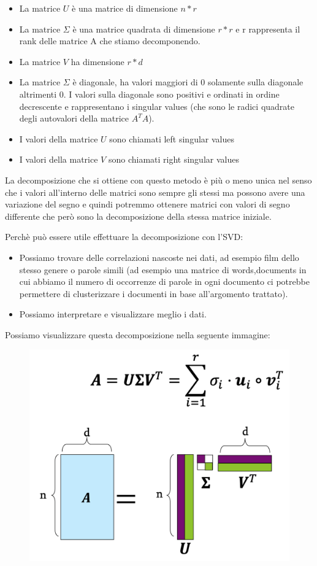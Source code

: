 \documentclass[14pt]{extreport}
\begin{document}
\begin{itemize}
	\item La matrice $U$ è una matrice di dimensione $n*r$
	\item La matrice $\Sigma$ è una matrice quadrata di dimensione $r*r$ e r rappresenta il rank delle matrice A che stiamo decomponendo.
	\item La matrice $V$ ha dimensione $r*d$
	\item La matrice $\Sigma$ è diagonale, ha valori maggiori di 0 solamente sulla diagonale altrimenti 0. I valori sulla diagonale sono positivi e
	      ordinati in ordine decrescente e rappresentano i singular values (che sono le radici quadrate degli autovalori della matrice $A^TA$).
	\item I valori della matrice $U$ sono chiamati left singular values
	\item I valori della matrice $V$ sono chiamati right singular values
\end{itemize}

La decomposizione che si ottiene con questo metodo è più o meno unica nel senso che i valori all'interno delle matrici sono sempre gli stessi ma
possono avere una variazione del segno e quindi potremmo ottenere matrici con valori di segno differente che però sono la decomposizione della stessa
matrice iniziale.

Perchè può essere utile effettuare la decomposizione con l'SVD:
\begin{itemize}
	\item Possiamo trovare delle correlazioni nascoste nei dati, ad esempio film dello stesso genere o parole simili (ad esempio una matrice di
	      words,documents in cui abbiamo il numero di occorrenze di parole in ogni documento ci potrebbe permettere di clusterizzare i documenti in
	      base all'argomento trattato).
	\item Possiamo interpretare e visualizzare meglio i dati.
\end{itemize}

Possiamo visualizzare questa decomposizione nella seguente immagine:


\begin{figure}[H]
	\centering
	\includegraphics[width=0.7\linewidth]{496.jpeg}
\end{figure}
\end{document}
